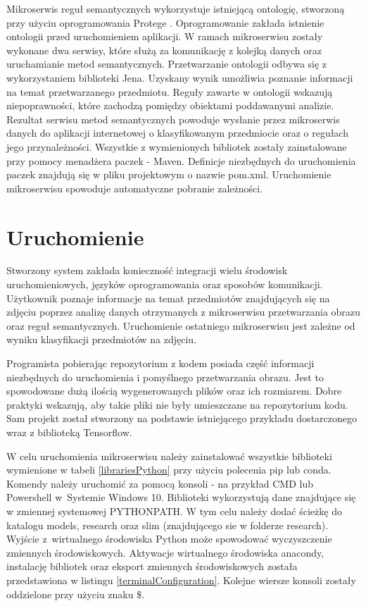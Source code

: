 Mikroserwis reguł semantycznych wykorzystuje istniejącą ontologię, stworzoną przy użyciu oprogramowania Protege \cite{Protege}. Oprogramowanie zakłada istnienie ontologii przed uruchomieniem aplikacji. W ramach mikroserwisu zostały wykonane dwa serwisy, które służą za komunikację z kolejką danych oraz uruchamianie metod semantycznych. Przetwarzanie ontologii odbywa się z wykorzystaniem biblioteki Jena. Uzyskany wynik umożliwia poznanie informacji na temat przetwarzanego przedmiotu. Reguły zawarte w ontologii wskazują niepoprawności, które zachodzą pomiędzy obiektami poddawanymi analizie. Rezultat serwisu metod semantycznych powoduje wysłanie przez mikroserwis danych do aplikacji internetowej o klasyfikowanym przedmiocie oraz o regułach jego przynależności. 
Wszystkie z wymienionych bibliotek zostały zainstalowane przy pomocy menadżera paczek - Maven. Definicje niezbędnych do uruchomienia paczek znajdują się w pliku projektowym o nazwie pom.xml. Uruchomienie mikroserwisu spowoduje automatyczne pobranie zależności.


\section{Uruchomienie}

Stworzony system zakłada konieczność integracji wielu środowisk uruchomieniowych, języków oprogramowania oraz sposobów komunikacji. Użytkownik poznaje informacje na temat przedmiotów znajdujących się na zdjęciu poprzez analizę danych otrzymanych z mikroserwisu przetwarzania obrazu oraz reguł semantycznych. Uruchomienie ostatniego mikroserwisu jest zależne od wyniku klasyfikacji przedmiotów na zdjęciu. 

Programista pobierając repozytorium z kodem posiada część informacji niezbędnych do uruchomienia i pomyślnego przetwarzania obrazu. Jest to spowodowane dużą ilością wygenerowanych plików oraz ich rozmiarem. Dobre praktyki wskazują, aby takie pliki nie były umieszczane na repozytorium kodu. Sam projekt został stworzony na podstawie istniejącego przykładu dostarczonego wraz z biblioteką Tensorflow. 

W celu uruchomienia mikroserwisu należy zainstalować wszystkie biblioteki wymienione w tabeli \ref{librariesPython} przy użyciu polecenia pip lub conda. Komendy należy uruchomić za pomocą konsoli - na przykład CMD lub Powershell\cite{Powershell} w~Systemie Windows 10. Biblioteki wykorzystują dane znajdujące się w zmiennej systemowej PYTHONPATH. W tym celu należy dodać ścieżkę do katalogu models, research oraz slim (znajdującego sie w folderze research). Wyjście z~wirtualnego środowiska Python może spowodować wyczyszczenie zmiennych środowiskowych. Aktywacje wirtualnego środowiska anacondy, instalację bibliotek oraz eksport zmiennych środowiskowych została przedstawiona w listingu \ref{terminalConfiguration}. Kolejne wiersze konsoli zostały oddzielone przy użyciu znaku \$.
\newpage


